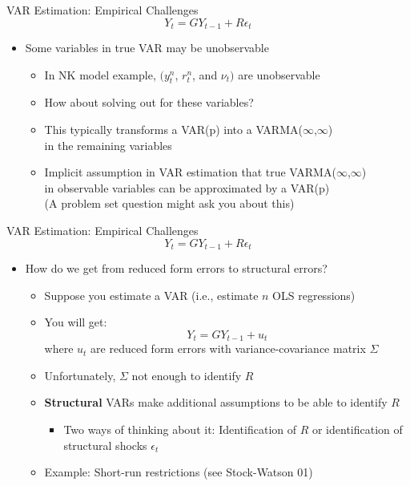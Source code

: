 \documentclass[11pt,aspectratio=169,xcolor={dvipsnames},hyperref={pdftex,pdfpagemode=UseNone,hidelinks,pdfdisplaydoctitle=true},usepdftitle=false]{beamer}
\begin{document}
\begin{frame}{VAR Estimation: Empirical Challenges}
\[ Y_{t} = G Y_{t-1} + R \epsilon_{t} \]
\begin{itemize}
\item Some variables in true VAR may be unobservable
\begin{itemize}
\item In NK model example, $(y_{t}^{n}$, $r_{t}^{n}$, and $\nu_{t})$ are unobservable
\item How about solving out for these variables?
\item This typically transforms a VAR(p) into a VARMA($\infty$,$\infty$) \\ in the remaining variables
\item Implicit assumption in VAR estimation that true VARMA($\infty$,$\infty$) \\ in observable variables can be approximated by a VAR(p) \\ {\footnotesize (A problem set question might ask you about this)}
\end{itemize}
\end{itemize}

\end{frame}


\begin{frame}{VAR Estimation: Empirical Challenges}
\[ Y_{t} = G Y_{t-1} + R \epsilon_{t} \]
\begin{itemize}
\setcounter{enumi}{1}
\item How do we get from reduced form errors to structural errors?
\begin{itemize}
\item Suppose you estimate a VAR (i.e., estimate $n$ OLS regressions) 
\item You will get:
\[ Y_{t} = G Y_{t-1} + u_{t} \]
where $u_{t}$ are reduced form errors with variance-covariance matrix $\Sigma$
\item Unfortunately, $\Sigma$ not enough to identify $R$
\item \textbf{Structural} VARs make additional assumptions to be able to identify $R$
\begin{itemize}
	\item Two ways of thinking about it: Identification of $R$ or identification of structural shocks $\epsilon_{t}$
\end{itemize}
\item Example: Short-run restrictions {\footnotesize (see Stock-Watson 01)}
\end{itemize}
\end{itemize}
\end{frame}
\end{document}
